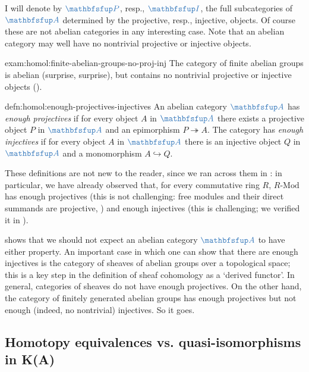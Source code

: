 I will denote by $\categ{P}$, resp., $\categ{I}$, the full
subcategories of $\categ{A}$ determined by the projective, resp.,
injective, objects. Of course these are not abelian categories in any
interesting case. Note that an abelian category may well have no
nontrivial projective or injective objects.

\begin{exam}{}{exam:homol:finite-abelian-groups-no-proj-inj}
  The category of finite abelian groups is abelian (surprise,
  surprise), but contains no nontrivial projective or injective
  objects
  ().
\end{exam}

\begin{defn}{}{defn:homol:enough-projectives-injectives}
  An abelian category $\categ{A}$ has \emph{enough projectives} if for
  every object $A$ in $\categ{A}$ there exists a projective object $P$
  in $\categ{A}$ and an epimorphism $P \twoheadrightarrow A$. The
  category has \emph{enough injectives} if for every object $A$ in
  $\categ{A}$ there is an injective object $Q$ in $\categ{A}$ and a
  monomorphism $A \hookrightarrow Q$.
\end{defn}

These definitions are not new to the reader, since we ran across them
in
:
in particular, we have already observed that, for every commutative
ring $R$, $R\text{-Mod}$ has enough projectives (this is not
challenging: free modules and their direct summands are projective,
) and enough injectives (this is challenging; we
verified it in ).

 shows that we should not expect an
abelian category $\categ{A}$ to have either property. An important
case in which one can show that there are enough injectives is the
category of sheaves of abelian groups over a topological space; this
is a key step in the definition of sheaf cohomology as a `derived
functor'. In general, categories of sheaves do not have enough
projectives. On the other hand, the category of finitely generated
abelian groups has enough projectives but not enough (indeed, no
nontrivial) injectives. So it goes.

\subsection{Homotopy equivalences vs. quasi-isomorphisms in K(A)}
\label{subsec:homol:homotopy-equivalences-vs-quasi-isomorphisms-in-k-a}

